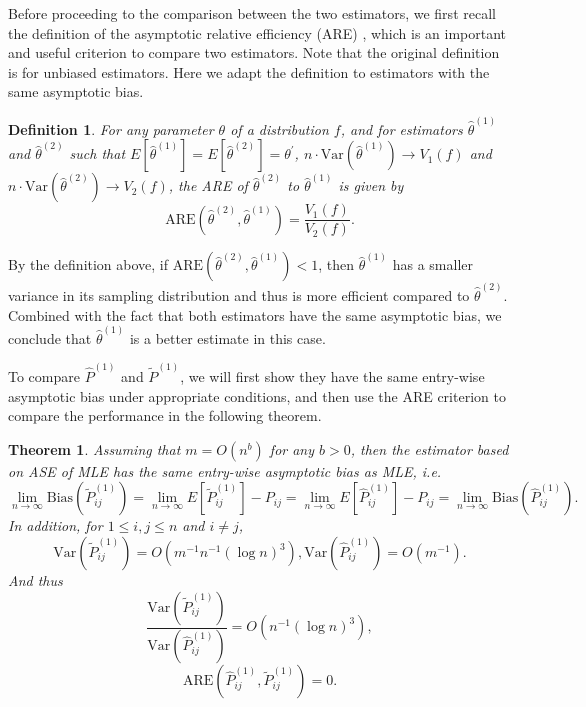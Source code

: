 \documentclass[a4paper]{article}
\newtheorem{theorem}[fact]{Theorem}
\newtheorem{definition}[fact]{Definition}
\renewcommand{\hat}{\widehat}
\begin{document}
Before proceeding to the comparison between the two estimators, we first recall the definition of the asymptotic relative efficiency (ARE) \citep{serfling2011asymptotic}, which is an important and useful criterion to compare two estimators. Note that the original definition is for unbiased estimators. Here we adapt the definition to estimators with the same asymptotic bias.
\begin{definition}
For any parameter $\theta$ of a distribution $f$, and for estimators $\hat{\theta}^{(1)}$ and $\hat{\theta}^{(2)}$ such that $E[\hat{\theta}^{(1)}] = E[\hat{\theta}^{(2)}] = \theta^{\prime}$, $n \cdot \mathrm{Var}(\hat{\theta}^{(1)}) \to V_1(f)$ and $n \cdot \mathrm{Var}(\hat{\theta}^{(2)}) \to V_2(f)$, the ARE of $\hat{\theta}^{(2)}$ to $\hat{\theta}^{(1)}$ is given by
\[
	\mathrm{ARE}(\hat{\theta}^{(2)}, \hat{\theta}^{(1)}) = \frac{V_1(f)}{V_2(f)}.
\]
\end{definition}

By the definition above, if $\mathrm{ARE}(\hat{\theta}^{(2)}, \hat{\theta}^{(1)}) < 1$, then $\hat{\theta}^{(1)}$ has a smaller variance in its sampling distribution and thus is more efficient compared to $\hat{\theta}^{(2)}$. Combined with the fact that both estimators have the same asymptotic bias, we conclude that $\hat{\theta}^{(1)}$ is a better estimate in this case.

To compare $\hat{P}^{(1)}$ and $\widetilde{P}^{(1)}$, we will first show they have the same entry-wise asymptotic bias under appropriate conditions, and then use the ARE criterion to compare the performance in the following theorem.

\begin{theorem}
\label{thm:MLEvsMLEASE}
Assuming that $m = O(n^b)$ for any $b > 0$, then the estimator based on ASE of MLE has the same entry-wise asymptotic bias as MLE, i.e.\
\[
	\lim_{n \to \infty} \mathrm{Bias}(\widetilde{P}_{ij}^{(1)}) = \lim_{n \to \infty} E[\widetilde{P}_{ij}^{(1)}] - P_{ij} = \lim_{n \to \infty} E[\hat{P}^{(1)}_{ij}] - P_{ij}
    = \lim_{n \to \infty} \mathrm{Bias}(\hat{P}_{ij}^{(1)}).
\]
In addition, for $1 \le i, j \le n$ and $i \ne j$,
\[
	\mathrm{Var}(\widetilde{P}_{ij}^{(1)}) = O(m^{-1} n^{-1} (\log n)^3),
	\mathrm{Var}(\hat{P}_{ij}^{(1)}) = O(m^{-1}).
\]
And thus
\[
	\frac{\mathrm{Var}(\widetilde{P}_{ij}^{(1)})}{\mathrm{Var}(\hat{P}_{ij}^{(1)})}
    = O(n^{-1} (\log n)^3),
\]
\[
	\mathrm{ARE}(\hat{P}_{ij}^{(1)}, \widetilde{P}_{ij}^{(1)}) = 0.
\]
\end{theorem}
\end{document}
